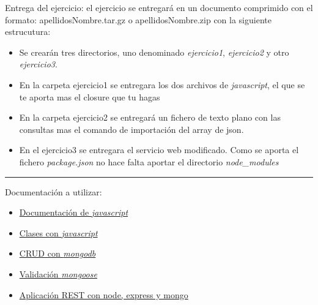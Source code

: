\documentclass[addpoints,12pt]{exam}
\begin{document}
\newpage
Entrega del ejercicio: el ejercicio se entregará en un documento comprimido con el formato: apellidosNombre.tar.gz o apellidosNombre.zip con la siguiente estrucutura:
\begin{itemize}
\item Se crearán tres directorios, uno denominado \emph{ejercicio1}, \emph{ejercicio2} y otro \emph{ejercicio3}.
\item En la carpeta ejercicio1 se entregara los dos archivos de \emph{javascript}, el que se te aporta mas el closure que tu hagas
\item En la carpeta ejercicio2 se entregará un fichero de texto plano con las consultas mas el comando de importación del array de json.
\item En el ejercicio3 se entregara el servicio web modificado. Como se aporta el fichero \emph{package.json} no hace falta aportar el directorio \emph{node\_modules}
\end{itemize}
\vspace{0,5cm}
\hrule
\vspace{0,5cm}
Documentación a utilizar:
\begin{itemize}
\item \href{https://www.w3schools.com/js/}{Documentación de \emph{javascript}}
\item \href{http://www.etnassoft.com/2016/12/02/introduccion-a-la-poo-en-javascript-moderno-las-nuevas-clases-en-es6/}{Clases con \emph{javascript}}
\item \href{https://docs.mongodb.com/manual/crud/}{CRUD con \emph{mongodb}}
\item \href{https://mongoosejs.com/docs/schematypes.html}{Validación \emph{mongoose}}
\item \href{https://www.codementor.io/olatundegaruba/nodejs-restful-apis-in-10-minutes-q0sgsfhbd}{Aplicación REST con node, express y mongo}
\end{itemize}
\end{document}

